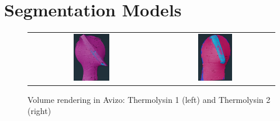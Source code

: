 \printbibliography
\newpage

\appendix
\noindent
\section{Segmentation Models}

\begin{figure}[h]
    \begin{tabular}{cc}
    	\includegraphics[width=0.3\textwidth]{images/avizo_flats/tlys9.jpg} & \includegraphics[width=0.3\textwidth]{images/avizo_flats/tlys2.jpg}
    \end{tabular}
	\caption{Volume rendering in Avizo: Thermolysin 1 (left) and Thermolysin 2 (right)}
 \label{tlys2}
\end{figure}


